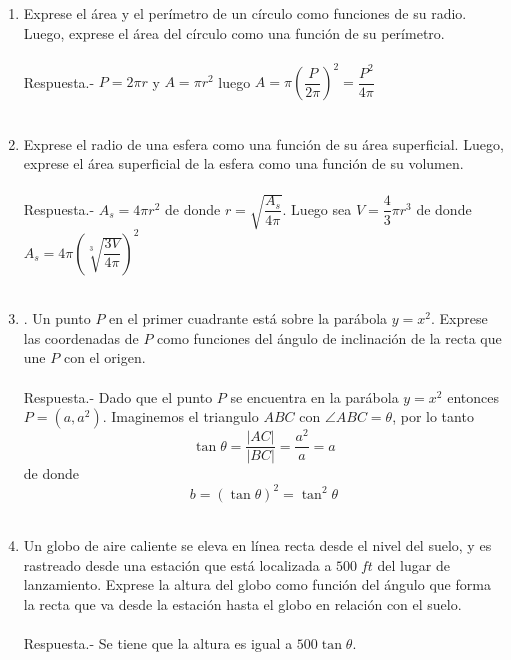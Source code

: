 \begin{enumerate}[\bfseries 1.]

\item Exprese el área y el perímetro de un círculo como funciones de su radio. Luego, exprese el área del círculo como una función de su perímetro.\\\\
    Respuesta.-\; $P=2\pi r$ y $A = \pi r^2$ luego $A = \pi \left(\dfrac{P}{2\pi}\right)^2 = \dfrac{P^2}{4\pi}$\\\\

\item Exprese el radio de una esfera como una función de su área superficial. Luego, exprese el área superficial de la esfera como una función de su volumen.\\\\
    Respuesta.-\; $A_s = 4\pi r^2$ de donde $r=\sqrt{\dfrac{A_s}{4\pi}}$. Luego sea $V = \dfrac{4}{3} \pi r^3$ de donde $A_s = 4 \pi \left(\sqrt[3]{\dfrac{3V}{4 \pi}}\right)^2$\\\\

\item . Un punto $P$ en el primer cuadrante está sobre la parábola $y = x^2$. Exprese las coordenadas de $P$ como funciones del ángulo de inclinación de la recta que une $P$ con el origen.\\\\
    Respuesta.-\; Dado que el punto $P$ se encuentra en la parábola $y=x^2$ entonces $P=(a,a^2)$. Imaginemos el triangulo $ABC$ con $\angle ABC = \theta$, por lo tanto $$\tan \theta = \dfrac{|AC|}{|BC|} = \dfrac{a^2}{a} = a$$ de donde $$b=(\tan \theta)^2 = \tan^2 \theta$$\\

\item Un globo de aire caliente se eleva en línea recta desde el nivel del suelo, y es rastreado desde una estación que está localizada a $500\;ft$ del lugar de lanzamiento. Exprese la altura del globo como función del ángulo que forma la recta que va desde la estación hasta el globo en relación con el suelo.\\\\
    Respuesta.-\; Se tiene que la altura es igual a $500\tan \theta$.\\\\ 


\end{enumerate}
